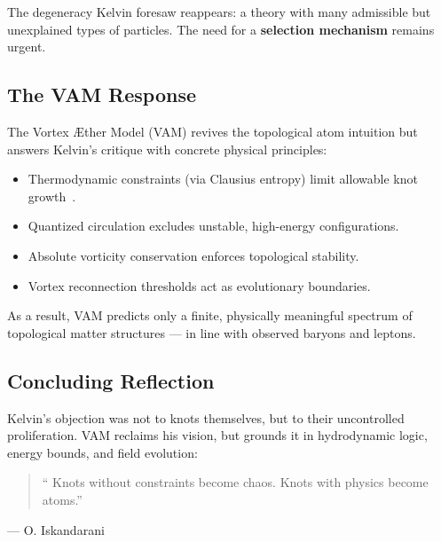    The degeneracy Kelvin foresaw reappears: a theory with many admissible but unexplained types of particles. The need for a \textbf{selection mechanism} remains urgent.

   \subsection*{The VAM Response}

   The Vortex Æther Model (VAM) revives the topological atom intuition but answers Kelvin's critique with concrete physical principles:

   \begin{itemize}
     \item Thermodynamic constraints (via Clausius entropy) limit allowable knot growth~\cite{clausius1865entropy}.
     \item Quantized circulation excludes unstable, high-energy configurations.
     \item Absolute vorticity conservation enforces topological stability.
     \item Vortex reconnection thresholds act as evolutionary boundaries.
   \end{itemize}

   As a result, VAM predicts only a finite, physically meaningful spectrum of topological matter structures — in line with observed baryons and leptons.

   \subsection*{Concluding Reflection}

   Kelvin's objection was not to knots themselves, but to their uncontrolled proliferation. VAM reclaims his vision, but grounds it in hydrodynamic logic, energy bounds, and field evolution:

   \begin{quote}
    `` Knots without constraints become chaos. Knots with physics become atoms.''
   \end{quote}
      \begin{flushright}
      — O. Iskandarani
      \end{flushright}